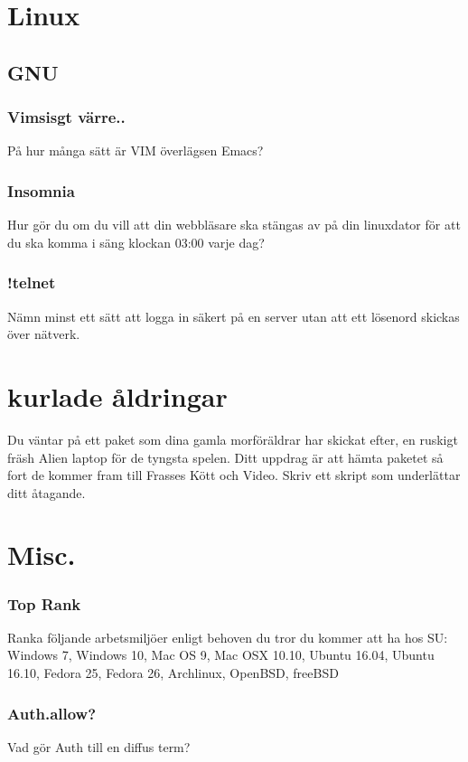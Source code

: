\documentclass[a4paper]{report}
\begin{document}
\section{Linux}
\subsection{GNU}

\subsubsection{Vimsisgt värre..}
På hur många sätt är VIM överlägsen Emacs?

\subsubsection{Insomnia}
Hur gör du om du vill att din webbläsare ska stängas av på din linuxdator för att du ska komma i säng klockan 03:00 varje dag?

\subsubsection{!telnet}
Nämn minst ett sätt att logga in säkert på en server utan att ett lösenord skickas över nätverk.

\section{kurlade åldringar}
Du väntar på ett paket som dina gamla morföräldrar har skickat efter, en ruskigt fräsh Alien laptop för de tyngsta spelen. Ditt uppdrag är att hämta paketet så fort de kommer fram till Frasses Kött och Video. Skriv ett skript som underlättar ditt åtagande.

\section{Misc.}
\subsubsection{Top Rank}
Ranka följande arbetsmiljöer enligt behoven du tror du kommer att ha hos SU:
Windows 7, Windows 10, Mac OS 9, Mac OSX 10.10, Ubuntu 16.04, Ubuntu 16.10, Fedora 25, Fedora 26, Archlinux, OpenBSD, freeBSD

\subsubsection{Auth.allow?}
Vad gör Auth till en diffus term?
\end{document}
